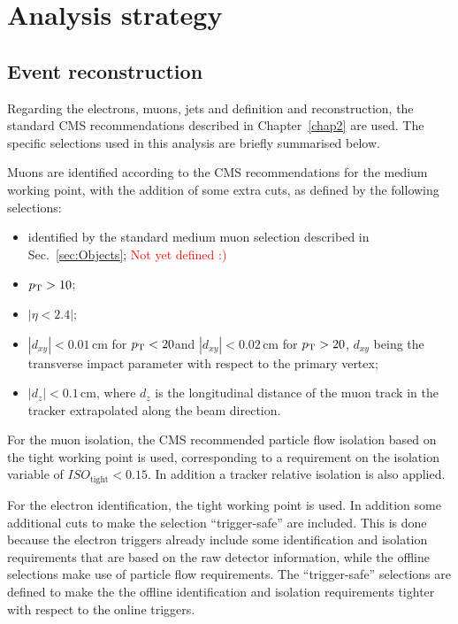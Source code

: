 \section{Analysis strategy}\label{chap5:analysis_strategy}

\subsection{Event reconstruction}

Regarding the electrons, muons, jets and \MET definition and reconstruction, the standard CMS recommendations described in Chapter~\ref{chap2} are used. The specific selections used in this analysis are briefly summarised below.

Muons are identified according to the CMS recommendations for the medium working point, with the addition of some extra cuts, as defined by the following selections:
\begin{itemize}
\item identified by the standard medium muon selection described in Sec.~\ref{sec:Objects}; \textcolor{red}{Not yet defined :)}
\item $p_\mathrm{T}> 10$\GeV;
\item $|\eta < 2.4|$;
\item $|d_{xy}| < 0.01$\,cm for $p_\mathrm{T} < 20$\GeV and $|d_{xy}| < 0.02$\,cm for $p_\mathrm{T} > 20$\GeV, $d_{xy}$ being the transverse impact parameter with respect to the primary vertex;
\item $|d_{z}| < 0.1$\,cm, where $d_z$ is the longitudinal distance of the muon track in the tracker extrapolated along the beam direction.
\end{itemize}

For the muon isolation, the CMS recommended particle flow isolation based on the tight working point is used, corresponding to a requirement on the isolation variable of $ISO_\mathrm{tight} < 0.15$. In addition a tracker relative isolation is also applied.

For the electron identification, the tight working point is used. In addition some additional cuts to make the selection ``trigger-safe'' are included. This is done because the electron triggers already include some identification and isolation requirements that are based on the raw detector information, while the offline selections make use of particle flow requirements. The ``trigger-safe'' selections are defined to make the the offline identification and isolation requirements tighter with respect to the online triggers.

